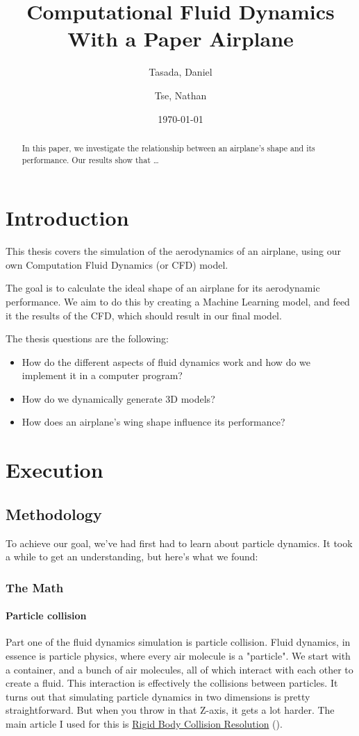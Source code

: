 \documentclass[a4paper,12pt]{report}
\title{Computational Fluid Dynamics With a Paper Airplane}
\author{
  Tasada, Daniel\\
  \and
  Tse, Nathan\\
}
\date{\today}
\begin{document}
\maketitle
\begin{abstract}
	In this paper, we investigate the relationship between an airplane's shape and its performance.
	Our results show that \dots
\end{abstract}

\tableofcontents

\chapter{Introduction}
This thesis covers the simulation of the aerodynamics of an airplane, using
our own Computation Fluid Dynamics (or CFD) model.

The goal is to calculate the ideal shape of an airplane for its aerodynamic performance.
We aim to do this by creating a Machine Learning model, and feed it the results of the CFD,
which should result in our final model.

The thesis questions are the following:
\begin{itemize}
	\item{How do the different aspects of fluid dynamics work and how do we implement it in a computer program?}
	\item{How do we dynamically generate 3D models?}
	\item{How does an airplane's wing shape influence its performance?}
\end{itemize}

\chapter{Execution}
\section{Methodology}
To achieve our goal, we've had first had to learn about particle dynamics.
It took a while to get an understanding, but here's what we found:

\subsection{The Math}
\subsubsection{Particle collision}
Part one of the fluid dynamics simulation is particle collision.
Fluid dynamics, in essence is particle physics, where every air molecule is a "particle".
We start with a container, and a bunch of air molecules, all of which interact with
each other to create a fluid. This interaction is effectively the collisions between particles.
It turns out that simulating  particle dynamics in two dimensions is pretty straightforward.
But when you throw in that Z-axis, it gets a lot harder.
The main article I used for this is \hyperlink{http://www.hakenberg.de/diffgeo/collision_resolution.htm}{Rigid Body Collision Resolution} (\cite{hakenberg}).
\end{document}
